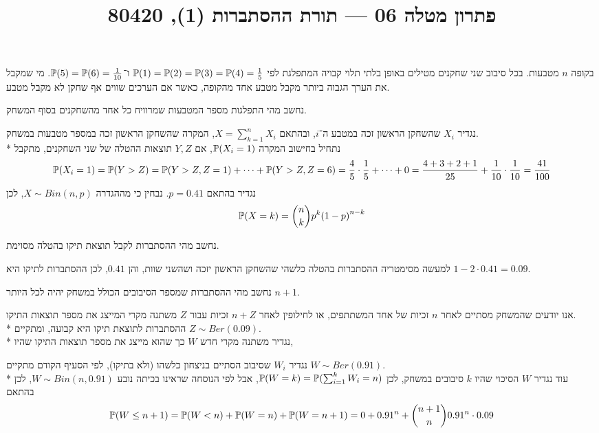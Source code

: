 
\title{פתרון מטלה 06 --- תורת ההסתברות (1), 80420}

\DeclareMathOperator{\Supp}{Supp}


\maketitle
\maketitleprint{}

\question{}
בקופה $n$ מטבעות. בכל סיבוב שני שחקנים מטילים באופן בלתי תלוי קבויה המתפלגת לפי $\mathbb{P}(1) = \mathbb{P}(2) = \mathbb{P}(3) = \mathbb{P}(4) = \frac{1}{5}$ ו־$\mathbb{P}(5) = \mathbb{P}(6) = \frac{1}{10}$.
מי שמקבל את הערך הגבוה ביותר מקבל מטבע אחד מהקופה, כאשר אם הערכים שווים אף שחקן לא מקבל מטבע.

\subquestion{}
נחשב מהי התפלגות מספר המטבעות שמרוויח כל אחד מהשחקנים בסוף המשחק.
\begin{solution}
	נגדיר $X_i$ שהשחקן הראשון זכה במטבע ה־$i$, ובהתאם $X = \sum_{k = 1}^{n} X_i$, המקרה שהשחקן הראשון זכה במספר מטבעות במשחק. \\*
	נתחיל בחישוב המקרה $\mathbb{P}(X_i = 1)$, אם $Y, Z$ תוצאות ההטלה של שני השחקנים, מתקבל
	\[
		\mathbb{P}(X_i = 1) = \mathbb{P}(Y > Z) = \mathbb{P}(Y > Z, Z = 1) + \cdots + \mathbb{P}(Y > Z, Z = 6) = \frac{4}{5} \cdot \frac{1}{5} + \cdots + 0 = \frac{4 + 3 + 2 + 1}{25} + \frac{1}{10} \cdot \frac{1}{10} = \frac{41}{100}
	\]
	נגדיר בהתאם $p = 0.41$.
	נבחין כי מההגדרה $X \sim Bin(n, p)$, לכן
	\[
		\mathbb{P}(X = k) = \binom{n}{k} p^k {(1 - p)}^{n - k}
	\]
\end{solution}

\subquestion{}
נחשב מהי ההסתברות לקבל תוצאת תיקו בהטלה מסוימת.
\begin{solution}
	למעשה מסימטריה ההסתברות בהטלה כלשהי שהשחקן הראשון יזכה ושהשני שוות, והן $0.41$, לכן ההסתברות לתיקו היא $1 - 2 \cdot 0.41 = 0.09$.
\end{solution}

\subquestion{}
נחשב מהי ההסתברות שמספר הסיבובים הכולל במשחק יהיה לכל היותר $n + 1$.
\begin{solution}
	אנו יודעים שהמשחק מסתיים לאחר $n$ זכיות של אחד המשתתפים, או לחילופין לאחר $n + Z$ זכיות עבור $Z$ משתנה מקרי המייצג את מספר תוצאות התיקו. \\*
	ההסתברות לתוצאת תיקו היא קבועה, ומתקיים $Z \sim Ber(0.09)$. \\*
	נגדיר משתנה מקרי חדש $W$ כך שהוא מייצג את מספר תוצאות התיקו שהיו, 

	נגדיר $W_i$ שסיבוב הסתיים בניצחון כלשהו (ולא בתיקו), לפי הסעיף הקודם מתקיים $W \sim Ber(0.91)$. \\*
	עוד נגדיר $W$ הסיכוי שהיו $k$ סיבובים במשחק, לכן $\mathbb{P}(W = k) = \mathbb{P}(\sum_{i = 1}^k W_i = n)$, אבל לפי הנוסחה שראינו בכיתה נובע $W \sim Bin(n, 0.91)$, לכן בהתאם
	\[
		\mathbb{P}(W \le n + 1)
		= \mathbb{P}(W < n) + \mathbb{P}(W = n) + \mathbb{P}(W = n + 1)
		= 0 + {0.91}^n + \binom{n + 1}{n} {0.91}^n \cdot 0.09
	\]
\end{solution}

